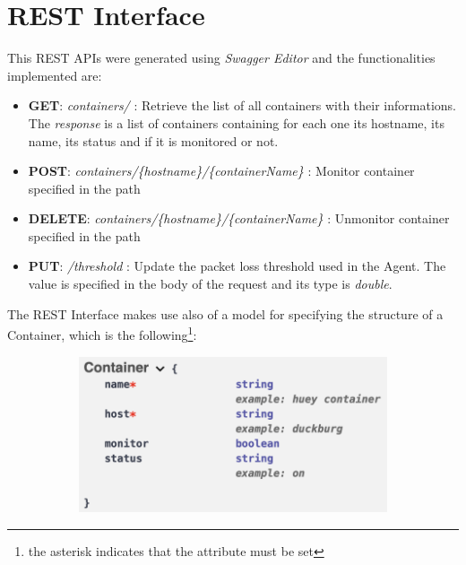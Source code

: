 \section{REST Interface}
This REST APIs were generated using \textit{Swagger Editor} and the functionalities implemented are:

\begin{itemize}
	\item \textbf{GET}:
		\subitem \textit{containers/} : Retrieve the list of all containers with their informations. The \textit{response} is a list of containers containing for each one its hostname, its name, its status and if it is monitored or not.
	\item \textbf{POST}:
		\subitem \textit{containers/\{hostname\}/\{containerName\}} : Monitor container specified in the path
	\item \textbf{DELETE}:
		\subitem \textit{containers/\{hostname\}/\{containerName\}} : Unmonitor container specified in the path
	\item \textbf{PUT}:
		\subitem \textit{/threshold} : Update the packet loss threshold used in the Agent. The value is specified in the body of the request and its type is \textit{double}.
\end{itemize}

\noindent The REST Interface makes use also of a model for specifying the structure of a Container, which is the following\footnote{the asterisk indicates that the attribute must be set}:

\begin{figure}[H]
	\begin{subfigure}{\textwidth}
	\centering
		\includegraphics[width=0.9\linewidth]{img/container.png} 
	\end{subfigure}
\end{figure}